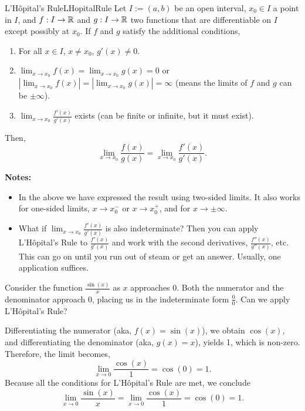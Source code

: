 \begin{propColor}{L'H\^opital's Rule}{LHopitalRule}
Let $I:=(a, b)$ be an open interval, $x_0 \in I$ a point in $I$, and $f:I \to \mathbb R$ and $g:I \to \mathbb R$ two functions that are differentiable on $I$ except possibly at $x_0$. If $f$ and $g$ satisfy the additional conditions,

\begin{enumerate}
\renewcommand{\labelenumi}{(\alph{enumi})}
\setlength{\itemsep}{.2cm}
    \item  For all $x\in I$, $x \neq x_0$, $g'(x) \neq 0$.
    \item  $\displaystyle \lim_{x \to x_0} f(x) = \lim_{x \to x_0} g(x) = 0$ or $ |\lim_{x \to x_0} f(x)| = | \lim_{x \to x_0} g(x)| = \infty$ (means the limits of $f$ and $g$ can be $\pm \infty$).
    \item   $\displaystyle \lim_{x \to x_0} \frac{f'(x)}{g'(x)}$ exists  (can be finite or infinite, but it must exist).
    \end{enumerate}
    Then, 
    \begin{equation}
        \label{eq:LhoptialRule}
        \lim_{x \to x_0} \frac{f(x)}{g(x)} = \lim_{x \to x_0} \frac{f'(x)}{g'(x)}.
    \end{equation}

    \textbf{Notes:} 
    \begin{itemize}
        \item In the above we have expressed the result using two-sided limits. It also works for one-sided limits, $x \to x_0^-$ or $x \to x_0^+$, and for $x \to \pm \infty$.
        \item What if $\displaystyle \lim_{x \to x_0} \frac{f'(x)}{g'(x)}$ is also indeterminate? Then you can apply L'H\^opital's Rule to $\frac{f'(x)}{g'(x)}$ and work with the second derivatives, $\frac{f''(x)}{g''(x)}$, etc. This can go on until you run out of steam or get an answer. Usually, one application suffices.
    \end{itemize}
\end{propColor}

\vspace*{.2cm}

\begin{example} Consider the function $ \frac{\sin(x)}{x} $ as $ x $ approaches 0. Both the numerator and the denominator approach 0, placing us in the indeterminate form $\frac{0}{0}$. Can we apply L'Hôpital's Rule?
\end{example}

\solution Differentiating the numerator (aka, $f(x) = \sin(x)$), we obtain $ \cos(x) $, and differentiating the denominator (aka, $g(x) = x$), yields 1, which is non-zero. Therefore, the limit becomes,
$$
\lim_{{x \to 0}} \frac{\cos(x)}{1} = \cos(0) = 1.
$$
Because all the conditions for L'H\^opital's Rule are met, we conclude
$$
\lim_{{x \to 0}} \frac{\sin(x)}{x} = \lim_{{x \to 0}} \frac{\cos(x)}{1} = \cos(0) = 1.
$$    

